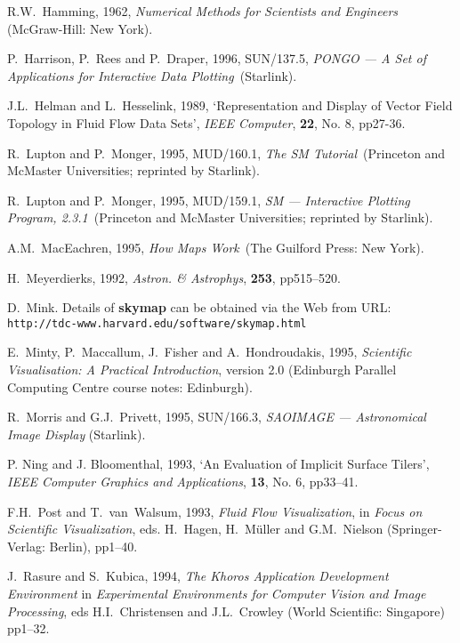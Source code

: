 \documentclass[twoside,11pt]{article}
\begin{document}
\begin{thebibliography}{99}
   R.W.~Hamming, 1962, {\it Numerical Methods for
   Scientists and Engineers}\, (McGraw-Hill: New York).

   P.~Harrison, P.~Rees and P.~Draper, 1996, SUN/137.5,
   {\it PONGO --- A Set of Applications for Interactive Data Plotting}\,
   (Starlink).

   J.L.~Helman and L.~Hesselink, 1989,
   `Representation and Display of Vector Field Topology in Fluid Flow
   Data Sets', {\it IEEE Computer}, {\bf 22}, No. 8, pp27-36.

   R.~Lupton and P.~Monger, 1995, MUD/160.1, {\it
   The SM Tutorial}\, (Princeton and McMaster Universities; reprinted
   by Starlink).

   R.~Lupton and P.~Monger, 1995, MUD/159.1, {\it
   SM --- Interactive Plotting Program, 2.3.1}\, (Princeton and McMaster
   Universities; reprinted by Starlink).

   A.M.~MacEachren, 1995, {\it How Maps Work}\,
   (The Guilford Press: New York).

   H.~Meyerdierks, 1992, {\it Astron. \& Astrophys},
   {\bf 253}, pp515--520.

   D.~Mink. Details of {\bf skymap} can be obtained
   via the Web from URL:
   {\tt http://tdc-www.harvard.edu/software/skymap.html}

   E.~Minty, P.~Maccallum, J.~Fisher and
   A.~Hondroudakis, 1995, {\it Scientific Visualisation: A Practical
   Introduction}, version 2.0 (Edinburgh Parallel Computing Centre
   course notes: Edinburgh).

   R.~Morris and G.J.~Privett, 1995, SUN/166.3,
   {\it SAOIMAGE --- Astronomical Image Display} (Starlink).

   P. Ning and J. Bloomenthal, 1993, `An Evaluation of
   Implicit Surface Tilers', {\it IEEE Computer Graphics and
   Applications}, {\bf 13}, No. 6, pp33--41.

   F.H.~Post and T.~van~Walsum, 1993, {\it Fluid Flow
   Visualization}, in {\it Focus on Scientific Visualization}, eds.
   H.~Hagen, H.~M\"{u}ller and G.M.~Nielson (Springer-Verlag: Berlin),
   pp1--40.

   J.~Rasure and S.~Kubica, 1994, {\it The Khoros Application
   Development Environment} in {\it Experimental Environments for
   Computer Vision and Image Processing}, eds H.I.~Christensen and
   J.L.~Crowley (World Scientific: Singapore)  pp1--32.


\end{thebibliography}
\end{document}
